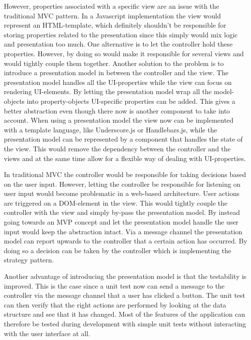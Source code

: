 However, properties associated with a specific view are an issue with the traditional MVC pattern. In a Javascript implementation the view would represent an HTML-template, which definitely shouldn't be responsible for storing properties related to the presentation since this simply would mix logic and presentation too much. One alternative is to let the controller hold these properties. However, by doing so would make it responsible for several views and would tightly couple them together. Another solution to the problem is to introduce a presentation model in between the controller and the view. The presentation model handles all the UI-properties while the view can focus on rendering UI-elements. By letting the presentation model wrap all the model-objects into property-objects UI-specific properties can be added. This gives a better abstraction even though there now is another component to take into account. When using a presentation model the view now can be implemented with a template language, like Underscore.js or Handlebars.js, while the presentation model can be represented by a component that handles the state of the view. This would remove the dependency between the controller and the views and at the same time allow for a flexible way of dealing with UI-properties.

In traditional MVC the controller would be responsible for taking decisions based on the user input. However, letting the controller be responsible for listening on user input would become problematic in a web-based architecture. User actions are triggered on a DOM-element in the view. This would tightly couple the controller with the view and simply by-pass the presentation model. By instead going towards an MVP concept and let the presentation model handle the user input would keep the abstraction intact. Via a message channel the presentation model can report upwards to the controller that a certain action has occurred. By doing so a decision can be taken by the controller which is implementing the strategy pattern.

Another advantage of introducing the presentation model is that the testability is improved. This is the case since a unit test now can send a message to the controller via the message channel that a user has clicked a button. The unit test can then verify that the right actions are performed by looking at the data structure and see that it has changed. Most of the features of the application can therefore be tested during development with simple unit tests without interacting with the user interface at all.

